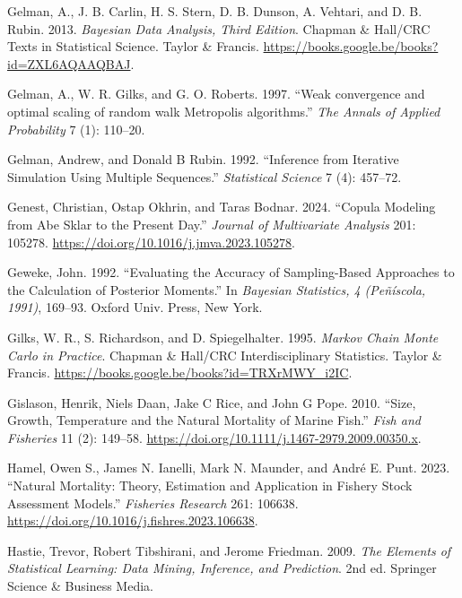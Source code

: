 \documentclass[
]{book}
\newlength{\cslhangindent}
\newlength{\cslentryspacingunit} %
\newenvironment{CSLReferences}[2] %
 {%
  \setlength{\parindent}{0pt}
  \ifodd #1
  \let\oldpar\par
  \def\par{\hangindent=\cslhangindent\oldpar}
  \fi
  \setlength{\parskip}{#2\cslentryspacingunit}
 }%
 {}
\begin{document}
\begin{CSLReferences}{1}{0}
\leavevmode{}%
Gelman, A., J. B. Carlin, H. S. Stern, D. B. Dunson, A. Vehtari, and D. B. Rubin. 2013. \emph{Bayesian Data Analysis, Third Edition}. Chapman \& Hall/CRC Texts in Statistical Science. Taylor \& Francis. \url{https://books.google.be/books?id=ZXL6AQAAQBAJ}.

\leavevmode{}%
Gelman, A., W. R. Gilks, and G. O. Roberts. 1997. {``{Weak convergence and optimal scaling of random walk Metropolis algorithms}.''} \emph{The Annals of Applied Probability} 7 (1): 110--20.

\leavevmode{}%
Gelman, Andrew, and Donald B Rubin. 1992. {``Inference from Iterative Simulation Using Multiple Sequences.''} \emph{Statistical Science} 7 (4): 457--72.

\leavevmode{}%
Genest, Christian, Ostap Okhrin, and Taras Bodnar. 2024. {``Copula Modeling from Abe Sklar to the Present Day.''} \emph{Journal of Multivariate Analysis} 201: 105278. \url{https://doi.org/10.1016/j.jmva.2023.105278}.

\leavevmode{}%
Geweke, John. 1992. {``Evaluating the Accuracy of Sampling-Based Approaches to the Calculation of Posterior Moments.''} In \emph{Bayesian Statistics, 4 ({P}eñíscola, 1991)}, 169--93. Oxford Univ. Press, New York.

\leavevmode{}%
Gilks, W. R., S. Richardson, and D. Spiegelhalter. 1995. \emph{Markov Chain Monte Carlo in Practice}. Chapman \& Hall/CRC Interdisciplinary Statistics. Taylor \& Francis. \url{https://books.google.be/books?id=TRXrMWY_i2IC}.

\leavevmode{}%
Gislason, Henrik, Niels Daan, Jake C Rice, and John G Pope. 2010. {``Size, Growth, Temperature and the Natural Mortality of Marine Fish.''} \emph{Fish and Fisheries} 11 (2): 149--58. \url{https://doi.org/10.1111/j.1467-2979.2009.00350.x}.

\leavevmode{}%
Hamel, Owen S., James N. Ianelli, Mark N. Maunder, and André E. Punt. 2023. {``Natural Mortality: Theory, Estimation and Application in Fishery Stock Assessment Models.''} \emph{Fisheries Research} 261: 106638. \url{https://doi.org/10.1016/j.fishres.2023.106638}.

\leavevmode{}%
Hastie, Trevor, Robert Tibshirani, and Jerome Friedman. 2009. \emph{The Elements of Statistical Learning: Data Mining, Inference, and Prediction}. 2nd ed. Springer Science \& Business Media.


\end{CSLReferences}
\end{document}
